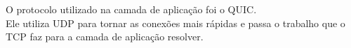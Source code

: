 
\begin{solution}
    O protocolo utilizado na camada de aplicação foi o QUIC.\\
    Ele utiliza UDP para tornar as conexões mais rápidas e passa o trabalho que o TCP faz para a camada de aplicação resolver.
\end{solution}